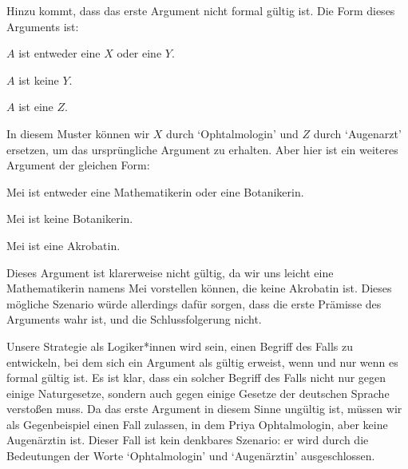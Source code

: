 Hinzu kommt, dass das erste Argument nicht formal gültig ist. Die Form dieses Arguments ist:
\begin{earg}
	\item[] $A$ ist entweder eine $X$ oder eine $Y$.
	\item[] $A$ ist keine $Y$.
	\item[\therefore] $A$ ist eine $Z$.
\end{earg}
In diesem Muster können wir $X$ durch `Ophtalmologin' und $Z$ durch `Augenarzt' ersetzen, um das ursprüngliche Argument zu erhalten. Aber hier ist ein weiteres Argument der gleichen Form:
\begin{earg}
	\item[] Mei ist entweder eine Mathematikerin oder eine Botanikerin.
	\item[] Mei ist keine Botanikerin.
	\item[\therefore] Mei ist eine Akrobatin.
\end{earg}
Dieses Argument ist klarerweise nicht gültig, da wir uns leicht eine Mathematikerin namens Mei vorstellen können, die keine Akrobatin ist. Dieses mögliche Szenario würde allerdings dafür sorgen, dass die erste Prämisse des Arguments wahr ist, und die Schlussfolgerung nicht.

Unsere Strategie als Logiker*innen wird sein, einen Begriff des Falls zu entwickeln, bei dem sich ein Argument als gültig erweist, wenn und nur wenn es formal gültig ist. Es ist klar, dass ein solcher Begriff des Falls nicht nur gegen einige Naturgesetze, sondern auch gegen einige Gesetze der deutschen Sprache versto{\ss}en muss. Da das erste Argument in diesem Sinne ungültig ist, müssen wir als Gegenbeispiel einen Fall zulassen, in dem Priya Ophtalmologin, aber keine Augenärztin ist. Dieser Fall ist kein denkbares Szenario: er wird durch die Bedeutungen der Worte `Ophtalmologin' und `Augenärztin' ausgeschlossen.

